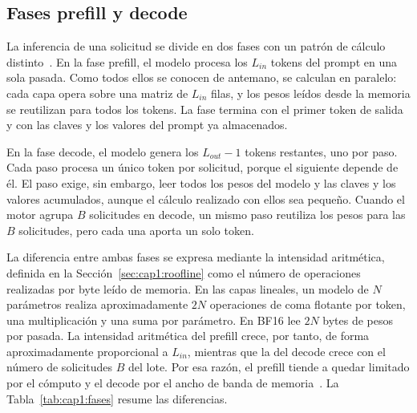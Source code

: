 \subsection{Fases prefill y decode}
\label{sec:cap1:fases}

La inferencia de una solicitud se divide en dos fases con un patrón de cálculo distinto~\cite{zhong2024distserve}. En la fase prefill, el modelo procesa los $L_{in}$ tokens del prompt en una sola pasada. Como todos ellos se conocen de antemano, se calculan en paralelo: cada capa opera sobre una matriz de $L_{in}$ filas, y los pesos leídos desde la memoria se reutilizan para todos los tokens. La fase termina con el primer token de salida y con las claves y los valores del prompt ya almacenados.

En la fase decode, el modelo genera los $L_{out} - 1$ tokens restantes, uno por paso. Cada paso procesa un único token por solicitud, porque el siguiente depende de él. El paso exige, sin embargo, leer todos los pesos del modelo y las claves y los valores acumulados, aunque el cálculo realizado con ellos sea pequeño. Cuando el motor agrupa $B$ solicitudes en decode, un mismo paso reutiliza los pesos para las $B$ solicitudes, pero cada una aporta un solo token.

La diferencia entre ambas fases se expresa mediante la intensidad aritmética, definida en la Sección~\ref{sec:cap1:roofline} como el número de operaciones realizadas por byte leído de memoria. En las capas lineales, un modelo de $N$ parámetros realiza aproximadamente $2N$ operaciones de coma flotante por token, una multiplicación y una suma por parámetro. En BF16 lee $2N$ bytes de pesos por pasada. La intensidad aritmética del prefill crece, por tanto, de forma aproximadamente proporcional a $L_{in}$, mientras que la del decode crece con el número de solicitudes $B$ del lote. Por esa razón, el prefill tiende a quedar limitado por el cómputo y el decode por el ancho de banda de memoria~\cite{zhong2024distserve}. La Tabla~\ref{tab:cap1:fases} resume las diferencias.

